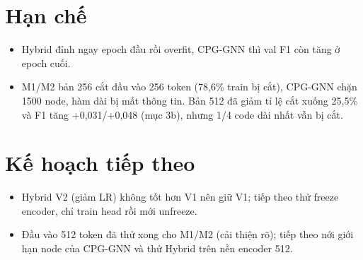 \documentclass[11pt,a4paper]{article}
\begin{document}
\section{Hạn chế}
\begin{itemize}[leftmargin=*,itemsep=0pt,topsep=2pt,parsep=0pt]
\item Hybrid đỉnh ngay epoch đầu rồi overfit, CPG-GNN thì val F1 còn tăng
  ở epoch cuối.
\item M1/M2 bản 256 cắt đầu vào 256 token (78,6\% train bị cắt),
  CPG-GNN chặn 1500 node, hàm dài bị mất thông tin.
  Bản 512 đã giảm tỉ lệ cắt xuống 25,5\% và F1 tăng +0,031/+0,048 (mục 3b),
  nhưng 1/4 code dài nhất vẫn bị cắt.
\end{itemize}

\section{Kế hoạch tiếp theo}
\begin{itemize}[leftmargin=*,itemsep=0pt,topsep=2pt,parsep=0pt]
\item Hybrid V2 (giảm LR) không tốt hơn V1 nên giữ V1; tiếp theo thử freeze
  encoder, chỉ train head rồi mới unfreeze.
\item Đầu vào 512 token đã thử xong cho M1/M2 (cải thiện rõ);
  tiếp theo nới giới hạn node của CPG-GNN và thử Hybrid trên nền encoder 512.
\end{itemize}
\end{document}
